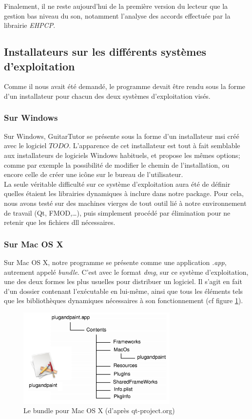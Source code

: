 \documentclass[a4paper,11pt]{article}
\begin{document}
Finalement, il ne reste aujourd'hui de la première version du lecteur que la gestion bas niveau du son, notamment l'analyse des accords effectuée par la librairie \textit{EHPCP}.

\subsection{Installateurs sur les différents systèmes d'exploitation}

Comme il nous avait été demandé, le programme devait être rendu sous la forme d'un installateur pour chacun des deux systèmes d'exploitation visés.

\subsubsection{Sur Windows}

Sur Windows, GuitarTutor se présente sous la forme d'un installateur msi créé avec le logiciel $TODO$. L'apparence de cet installateur est tout à fait semblable aux installateurs de logiciels Windows habituels, et propose les mêmes options; comme par exemple la possibilité de modifier le chemin de l'installation, ou encore celle de créer une icône sur le bureau de l'utilisateur.\\

La seule véritable difficulté sur ce système d'exploitation aura été de définir quelles étaient les librairies dynamiques à inclure dans notre package. Pour cela, nous avons testé sur des machines vierges de tout outil lié à notre environnement de travail (Qt, FMOD,\dots), puis simplement procédé par élimination pour ne retenir que les fichiers dll nécessaires.

\subsubsection{Sur Mac OS X}

Sur Mac OS X, notre programme se présente comme une application \textit{.app}, autrement appelé \textit{bundle}. C'est avec le format \textit{dmg}, sur ce système d'exploitation, une des deux formes les plus usuelles pour distribuer un logiciel. Il s'agit en fait d'un dossier contenant l'exécutable en lui-même, ainsi que tous les éléments tels que les bibliothèques dynamiques nécessaires à son fonctionnement (cf figure \ref{app_mac_os}).

\begin{figure}[H]
\begin{center}
\includegraphics[width=300px]{bundle_mac.png}
\caption{Le bundle pour Mac OS X (d'après qt-project.org)}
\label{app_mac_os}
\end{center}
\end{figure}
\end{document}
